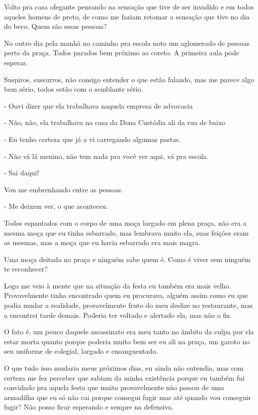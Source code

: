 Volto pra casa ofegante pensando na sensação que tive de ser invadido e em todos aqueles homens de preto, de como me faziam retomar a sensação que tive no dia do beco. Quem são essas pessoas?

No outro dia pela manhã no caminho pra escola noto um aglomerado de pessoas perto da praça. Todos parados bem próximo ao coreto. A primeira aula pode esperar.

Suspiros, sussurros, não consigo entender o que estão falando, mas me parece algo bem sério, todos estão com o semblante sério.

- Ouvi dizer que ela trabalhava naquela empresa de advocacia

- Não, não, ela trabalhava na casa da Dona Custódia ali da rua de baixo

- Eu tenho certeza que já a vi carregando algumas pastas.

- Não vá lá menino, não tem nada pra você ver aqui, vá pra escola. 

- Sai daqui!

Vou me embrenhando entre as pessoas.

- Me deixem ver, o que aconteceu.

Todos espantados com o corpo de uma moça largado em plena praça, não era a mesma moça que eu tinha esbarrado, mas lembrava muito ela, suas feições eram as mesmas, mas a moça que eu havia esbarrado era mais magra.

Uma moça deitada na praça e ninguém sabe quem é. Como é viver sem ninguém te reconhecer?

Logo me veio à mente que na situação da festa eu também era mais velho. Provavelmente tinha encontrado quem eu procurava, alguém assim como eu que podia mudar a realidade, provavelmente fruto do meu deslize no restaurante, mas a encontrei tarde demais. Poderia ter voltado e alertado ela, mas não o fiz.

O fato é, um pouco daquele assassinato era meu tanto no âmbito da culpa por ela estar morta quanto porque poderia muito bem ser eu ali na praça, um garoto no seu uniforme de colegial, largado e ensanguentado.

O que tudo isso mudaria meus próximos dias, eu ainda não entendia, mas com certeza me fez perceber que sabiam da minha existência porque eu também fui convidado pra aquela festa que muito provavelmente não passou de uma armadilha que eu só não cai porque consegui fugir mas até quando vou conseguir fugir? Não posso ficar esperando e sempre na defensiva.
